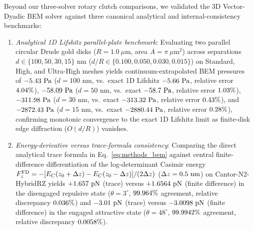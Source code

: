\documentclass[pdflatex,sn-nature]{sn-jnl}
\DeclareRobustCommand{\roundtwo}[1]{\fpeval{round(#1,2)}}
\DeclareRobustCommand{\roundthree}[1]{\fpeval{round(#1,3)}}
\DeclareRobustCommand{\roundfour}[1]{\fpeval{round(#1,4)}}
\begin{document}
Beyond our three-solver rotary clutch comparisons, we validated the 3D Vector-Dyadic BEM solver against three canonical analytical and internal-consistency benchmarks:
\begin{enumerate}
    \item \emph{Analytical 1D Lifshitz parallel-plate benchmark}: Evaluating two parallel circular Drude gold disks ($R = 1.0\ \mu\text{m}$, area $A = \pi\ \mu\text{m}^2$) across separations $d \in \{100, 50, 30, 15\}\text{ nm}$ ($d/R \in \{0.100, 0.050, 0.030, 0.015\}$) on Standard, High, and Ultra-High meshes yields continuum-extrapolated BEM pressures of $\roundtwo{\BemValPlateBemContinuumDonezerozeronmPa}\text{ Pa}$ ($d=100\text{ nm}$, vs.\ exact 1D Lifshitz $\roundtwo{\BemValLifshitzExactDonezerozeronmPa}\text{ Pa}$, relative error $\roundtwo{\BemValPlateRelErrContinuumDonezerozeronmPct}\%$), $\roundtwo{\BemValPlateBemContinuumDfivezeronmPa}\text{ Pa}$ ($d=50\text{ nm}$, vs.\ exact $\roundtwo{\BemValLifshitzExactDfivezeronmPa}\text{ Pa}$, relative error $\roundtwo{\BemValPlateRelErrContinuumDfivezeronmPct}\%$), $\roundtwo{\BemValPlateBemContinuumDthreezeronmPa}\text{ Pa}$ ($d=30\text{ nm}$, vs.\ exact $\roundtwo{\BemValLifshitzExactDthreezeronmPa}\text{ Pa}$, relative error $\roundtwo{\BemValPlateRelErrContinuumDthreezeronmPct}\%$), and $\roundtwo{\BemValPlateBemContinuumDonefivenmPa}\text{ Pa}$ ($d=15\text{ nm}$, vs.\ exact $\roundtwo{\BemValLifshitzExactDonefivenmPa}\text{ Pa}$, relative error $\roundtwo{\BemValPlateRelErrContinuumDonefivenmPct}\%$), confirming monotonic convergence to the exact 1D Lifshitz limit as finite-disk edge diffraction ($O(d/R)$) vanishes.
    \item \emph{Energy-derivative versus trace-formula consistency}: Comparing the direct analytical trace formula in Eq.~\eqref{eq:methods_bem} against central finite-difference differentiation of the log-determinant Casimir energy $F_z^{\rm FD} = -[E_C(z_0 + \Delta z) - E_C(z_0 - \Delta z)]/(2\Delta z)$ ($\Delta z = 0.5{}\text{ nm}$) on Cantor-N2-HybridRZ yields $+\roundfour{\BemValCantorThetathreeTraceFzPn}\text{ pN}$ (trace) versus $+\roundfour{\BemValCantorThetathreeFdFzPn}\text{ pN}$ (finite difference) in the disengaged repulsive state ($\theta=3^\circ$, $\roundthree{\BemValCantorThetathreeTraceVsFdAgreementPct}\%$ agreement, relative discrepancy $\roundthree{\BemValCantorThetathreeTraceVsFdRelErrPct}\%$) and $\roundfour{\BemValCantorThetafoureightTraceFzPn}\text{ pN}$ (trace) versus $\roundfour{\BemValCantorThetafoureightFdFzPn}\text{ pN}$ (finite difference) in the engaged attractive state ($\theta=48^\circ$, $\roundfour{\BemValCantorThetafoureightTraceVsFdAgreementPct}\%$ agreement, relative discrepancy $\roundfour{\BemValCantorThetafoureightTraceVsFdRelErrPct}\%$).

\end{enumerate}
\end{document}
